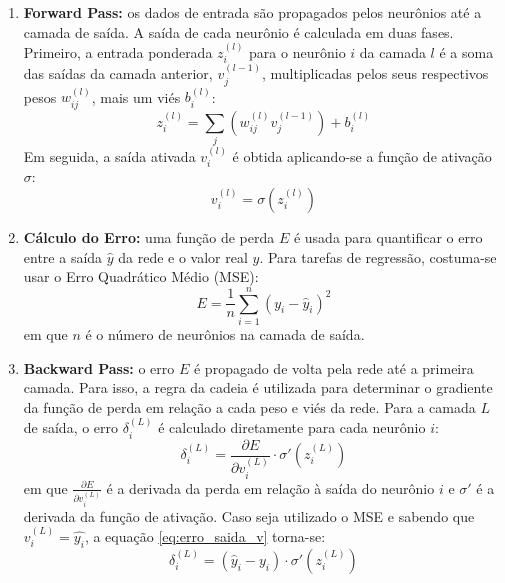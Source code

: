 \newpage
\begin{enumerate}
\item \textbf{Forward Pass:} os dados de entrada são propagados pelos neurônios até a camada de saída. A saída de cada 
neurônio é calculada em duas fases. Primeiro, a entrada ponderada $ z_i^{(l)} $ para o neurônio $ i $ da camada
$ l $ é a soma das saídas da camada anterior, $ v_j^{(l-1)} $, multiplicadas pelos seus respectivos pesos $ w_{ij}^{(l)} $, 
mais um viés $ b_i^{(l)} $:
\begin{equation}
\label{eq:soma_ponderada_u}
z_i^{(l)} = \sum_{j} (w_{ij}^{(l)} v_j^{(l-1)}) + b_i^{(l)}
\end{equation}
Em seguida, a saída ativada $ v_i^{(l)} $ é obtida aplicando-se a função de ativação $ \sigma $:
\begin{equation}
\label{eq:ativacao_v}
v_i^{(l)} = \sigma(z_i^{(l)})
\end{equation}

\item \textbf{Cálculo do Erro:} uma função de perda $ E $ é usada para quantificar o erro entre a saída $ \hat{y} $ da 
rede e o valor real $ y $. Para tarefas de regressão, costuma-se usar o Erro Quadrático Médio (MSE):
\begin{equation}
\label{eq:mse_v}
E = \frac{1}{n} \sum_{i=1}^{n} (y_{i} - \hat{y}_i)^2
\end{equation}
em que $ n $ é o número de neurônios na camada de saída.

\item \textbf{Backward Pass:} o erro $ E $ é propagado de volta pela rede até a primeira camada. Para isso, a regra da cadeia 
é utilizada para determinar o gradiente da função de perda em relação a cada peso e viés da rede. Para a camada $ L $ de saída, 
o erro $ \delta_i^{(L)} $ é calculado diretamente para cada neurônio $ i $:
\begin{equation}
\label{eq:erro_saida_v}
\delta_i^{(L)} = \frac{\partial E}{\partial v_i^{(L)}} \cdot \sigma'(z_i^{(L)})
\end{equation}
em que $\frac{\partial E}{\partial v_i^{(L)}}$ é a derivada da perda em relação à saída do neurônio $i$ e $\sigma'$ é a 
derivada da função de ativação. Caso seja utilizado o MSE e sabendo que $ v_i^{(L)} = \hat{y_i} $, a equação 
\ref{eq:erro_saida_v} torna-se:
\begin{equation}
\label{eq:erro_saida_mse_v}
\delta_i^{(L)} = (\hat{y}_i - y_i) \cdot \sigma'(z_i^{(L)})
\end{equation}


\end{enumerate}

